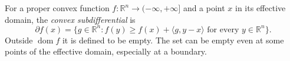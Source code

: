
For a proper convex function $f:\mathbb R^n\to(-\infty,+\infty]$ and a point $x$ in its effective domain, the \emph{convex subdifferential} is
\[
\partial f(x)=\{g\in\mathbb R^n:f(y)\ge f(x)+\langle g,y-x\rangle\text{ for every }y\in\mathbb R^n\}.
\]
Outside $\operatorname{dom}f$ it is defined to be empty. The set can be empty even at some points of the effective domain, especially at a boundary.
